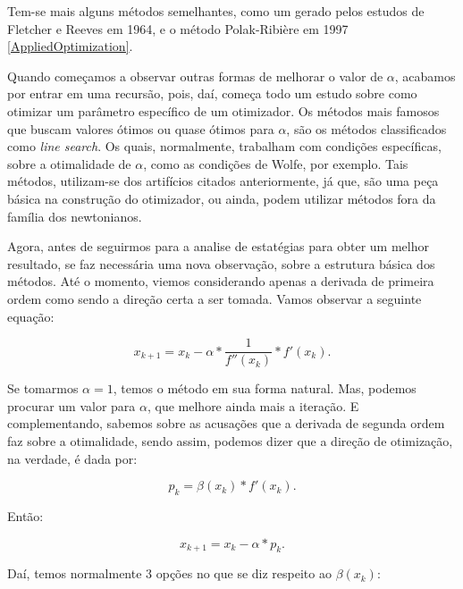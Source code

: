 Tem-se mais alguns métodos semelhantes, como um gerado pelos estudos de
Fletcher e Reeves em 1964, e o método Polak-Ribière em 1997
\ref{AppliedOptimization}.

Quando começamos a observar outras formas de melhorar o valor de \(\alpha\),
acabamos por entrar em uma recursão, pois, daí, começa todo um estudo sobre como
otimizar um parâmetro específico de um otimizador. Os métodos mais famosos que
buscam valores ótimos ou quase ótimos para \(\alpha\), são os métodos
classificados como \textit{line search}. Os quais, normalmente, trabalham
com condições específicas, sobre a otimalidade de \(\alpha\), como as condições
de Wolfe, por exemplo. Tais métodos, utilizam-se dos artifícios citados
anteriormente, já que, são uma peça básica na construção do otimizador,
ou ainda, podem utilizar métodos fora da família dos newtonianos.

Agora, antes de seguirmos para a analise de estatégias para obter um melhor
resultado, se faz necessária uma nova observação, sobre a estrutura básica
dos métodos. Até o momento, viemos considerando apenas a derivada de primeira
ordem como sendo a direção certa a ser tomada. Vamos observar a seguinte
equação:

\begin{equation}
    x_{k+1} = x_{k} - \alpha * \frac{1}{f''(x_k)} * f'(x_k).
\end{equation}

Se tomarmos \(\alpha = 1\), temos o método em sua forma natural. Mas,
podemos procurar um valor para \(\alpha\), que melhore ainda mais a iteração.
E complementando, sabemos sobre as acusações que a derivada de segunda ordem
faz sobre a otimalidade, sendo assim, podemos dizer que a direção de otimização,
na verdade, é dada por:

\begin{equation}
    p_k = \beta(x_k) * f'(x_k).
\end{equation}

Então:

\begin{equation}
    x_{k+1} = x_{k} - \alpha * p_{k}.
\end{equation}


Daí, temos normalmente 3 opções no que se diz respeito ao \(\beta(x_k)\):

